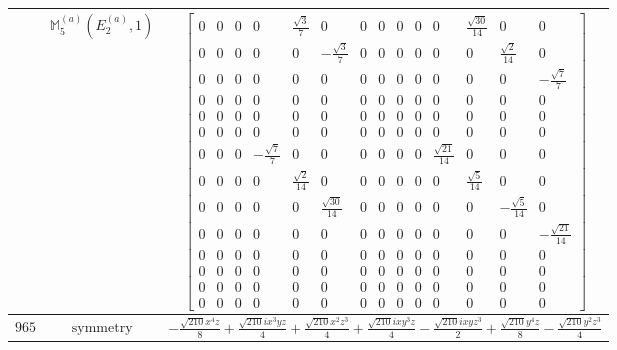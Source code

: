 \documentclass[fleqn,8pt,landscape]{jsarticle}
\begin{document}
\begin{longtable}{ccc}
$  $ & $ \mathbb{M}_{5}^{(a)}(E_{2}^{(a)},1) $ & $ \begin{bmatrix} 0 & 0 & 0 & 0 & \frac{\sqrt{3}}{7} & 0 & 0 & 0 & 0 & 0 & 0 & \frac{\sqrt{30}}{14} & 0 & 0 \\ 0 & 0 & 0 & 0 & 0 & - \frac{\sqrt{3}}{7} & 0 & 0 & 0 & 0 & 0 & 0 & \frac{\sqrt{2}}{14} & 0 \\ 0 & 0 & 0 & 0 & 0 & 0 & 0 & 0 & 0 & 0 & 0 & 0 & 0 & - \frac{\sqrt{7}}{7} \\ 0 & 0 & 0 & 0 & 0 & 0 & 0 & 0 & 0 & 0 & 0 & 0 & 0 & 0 \\ 0 & 0 & 0 & 0 & 0 & 0 & 0 & 0 & 0 & 0 & 0 & 0 & 0 & 0 \\ 0 & 0 & 0 & 0 & 0 & 0 & 0 & 0 & 0 & 0 & 0 & 0 & 0 & 0 \\ 0 & 0 & 0 & - \frac{\sqrt{7}}{7} & 0 & 0 & 0 & 0 & 0 & 0 & \frac{\sqrt{21}}{14} & 0 & 0 & 0 \\ 0 & 0 & 0 & 0 & \frac{\sqrt{2}}{14} & 0 & 0 & 0 & 0 & 0 & 0 & \frac{\sqrt{5}}{14} & 0 & 0 \\ 0 & 0 & 0 & 0 & 0 & \frac{\sqrt{30}}{14} & 0 & 0 & 0 & 0 & 0 & 0 & - \frac{\sqrt{5}}{14} & 0 \\ 0 & 0 & 0 & 0 & 0 & 0 & 0 & 0 & 0 & 0 & 0 & 0 & 0 & - \frac{\sqrt{21}}{14} \\ 0 & 0 & 0 & 0 & 0 & 0 & 0 & 0 & 0 & 0 & 0 & 0 & 0 & 0 \\ 0 & 0 & 0 & 0 & 0 & 0 & 0 & 0 & 0 & 0 & 0 & 0 & 0 & 0 \\ 0 & 0 & 0 & 0 & 0 & 0 & 0 & 0 & 0 & 0 & 0 & 0 & 0 & 0 \\ 0 & 0 & 0 & 0 & 0 & 0 & 0 & 0 & 0 & 0 & 0 & 0 & 0 & 0 \end{bmatrix} $ \\ \hline
$ 965 $ & $ \text{symmetry} $ & $ - \frac{\sqrt{210} x^{4} z}{8} + \frac{\sqrt{210} i x^{3} y z}{4} + \frac{\sqrt{210} x^{2} z^{3}}{4} + \frac{\sqrt{210} i x y^{3} z}{4} - \frac{\sqrt{210} i x y z^{3}}{2} + \frac{\sqrt{210} y^{4} z}{8} - \frac{\sqrt{210} y^{2} z^{3}}{4} $ \\

\end{longtable}
\end{document}
